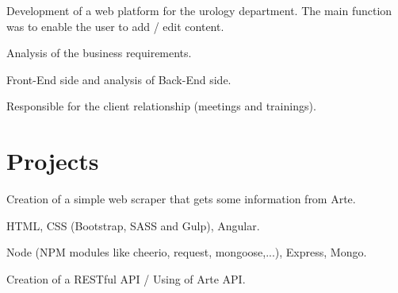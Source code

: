 \documentclass[letterpaper]{my-resume} %
\begin{document}
\begin{minipage}[t]{0.66\textwidth}
\sectionspace %



Development of a web platform for the urology department. The main function was to enable the user to add / edit content.
\begin{tightitemize}
\item Analysis of the business requirements.
\item Front-End side and analysis of Back-End side.
\item Responsible for the client relationship (meetings and trainings).
\end{tightitemize}

\sectionspace %


\section{Projects}

Creation of a simple web scraper that gets some information from Arte.
\begin{tightitemize}
\item HTML, CSS (Bootstrap, SASS and Gulp), Angular.
\item Node (NPM modules like cheerio, request, mongoose,...), Express, Mongo.
\item Creation of a RESTful API / Using of Arte API.
\end{tightitemize}


\end{minipage}
\end{document}
